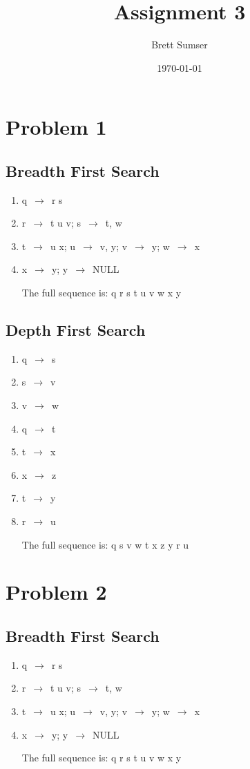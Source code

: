 \documentclass{article}
\title{Assignment 3}
\author{Brett Sumser}
\date\today
\begin{document}
\maketitle %


\section*{Problem 1}

\subsection{Breadth First Search}
\begin{enumerate}
\item q $\, \to\,$ r s
\item r $\, \to\,$ t u v; s $\, \to\,$ t, w
\item t $\, \to\,$ u x; u $\, \to\,$ v, y; v $\, \to\,$ y; w $\, \to\,$ x
\item x $\, \to\,$ y; y $\, \to\,$ NULL

  The full sequence is: q r s t u v w x y
\end{enumerate}


\subsection{Depth First Search}
\begin{enumerate}
\item q $\, \to\,$ s
\item s $\, \to\,$ v
\item v $\, \to\,$ w
\item q $\, \to\,$ t
\item t $\, \to\,$ x
\item x $\, \to\,$ z
\item t $\, \to\,$ y
\item r $\, \to\,$ u

  The full sequence is: q s v w t x z y r u

\end{enumerate}


\section*{Problem 2}

\subsection{Breadth First Search}
\begin{enumerate}
\item q $\, \to\,$ r s
\item r $\, \to\,$ t u v; s $\, \to\,$ t, w
\item t $\, \to\,$ u x; u $\, \to\,$ v, y; v $\, \to\,$ y; w $\, \to\,$ x
\item x $\, \to\,$ y; y $\, \to\,$ NULL

  The full sequence is: q r s t u v w x y
\end{enumerate}
\end{document}
